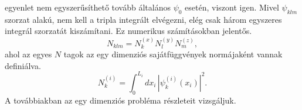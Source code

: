  egyenlet nem egyszerűsíthető tovább általános $\psi_0$ esetén, viszont  igen. Mivel $\psi_{klm}$ szorzat alakú, nem kell a tripla integrált elvégezni, elég csak három egyszeres integrál szorzatát kiszámítani. Ez numerikus számításokban jelentős.
\begin{equation}
	N_{klm} = N^{(x)}_kN^{(y)}_lN^{(z)}_m,
\end{equation}
ahol az egyes $N$ tagok az egy dimenziós sajátfüggvények normájaként vannak definiálva.
\begin{equation}
	N^{(i)}_k = \int_0^{L_i}dx_i\,\left|\psi^{(i)}_k(x_i)\right|^2.
\end{equation}
A továbbiakban az egy dimenziós probléma részleteit vizsgáljuk.

%    
%    
